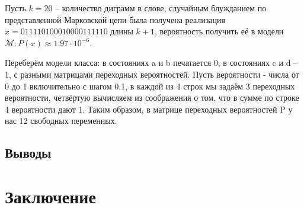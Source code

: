 \documentclass[12pt]{article}
\begin{document}
	Пусть $k = 20$ -- количество диграмм в слове, случайным блужданием по представленной Марковской цепи была получена реализация $x = 011110100010000111110$ длины $k+1$, вероятность получить её в модели $\mathcal{M}: P(x) \approx 1.97\cdot 10^{-6}$.
	
	Переберём модели класса: в состояниях a и b печатается 0, в состояниях c и d -- 1, с разными матрицами переходных вероятностей. Пусть вероятности - числа от 0 до 1 включительно с шагом 0.1, в каждой из 4 строк мы задаём 3 переходных вероятности, четвёртую вычисляем из соображения о том, что в сумме по строке 4 вероятности дают 1. Таким образом, в матрице переходных вероятностей P у нас 12 свободных переменных.
	
	\subsection*{Выводы}
	
	\section{Заключение}
	

	
	
	
\end{document}

